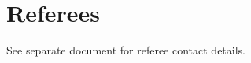 \documentclass[letterpaper]{article}
\begin{document}
\section*{Referees}
See separate document for referee contact details.
%	
%	
%
%
\end{document}
